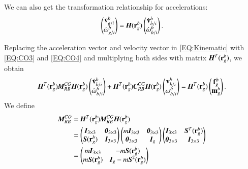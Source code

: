 We can also get the transformation relationship for accelerations:
\begin{align}
\begin{pmatrix}
\dot{\vec{v}}^{b}_{g/i} \\
\dot{\vec{\omega}}^{b}_{g/i}
\end{pmatrix}
=\emph{\textbf{H}}(\vec{r}^{b}_{g})
\begin{pmatrix}
\dot{\vec{v}}^{b}_{b/i} \\
\dot{\vec{\omega}}^{b}_{b/i}
\end{pmatrix}\label{EQ:CO4}.
\end{align}

Replacing the acceleration vector and velocity vector in \ref{EQ:Kinematic} with \ref{EQ:CO3} and \ref{EQ:CO4} and multiplying both sides with matrix $\emph{\textbf{H}}^{T}(\vec{r}^{b}_{g})$, we obtain 
\begin{align}
\emph{\textbf{H}}^{T}(\vec{r}^{b}_{g})\emph{\textbf{M}}_{RB}^{CG}\emph{\textbf{H}}(\vec{r}^{b}_{g})
\begin{pmatrix}
\dot{\vec{v}}^{b}_{b/i} \\
\dot{\vec{\omega}}^{b}_{b/i}
\end{pmatrix}
+
\emph{\textbf{H}}^{T}(\vec{r}^{b}_{g})\emph{\textbf{C}}_{RB}^{CG}\emph{\textbf{H}}(\vec{r}^{b}_{g})
\begin{pmatrix}
\vec{v}^{b}_{b/i} \\
\vec{\omega}^{b}_{b/i}
\end{pmatrix}
=
\emph{\textbf{H}}^{T}(\vec{r}_{g}^{b})
\begin{pmatrix}
\vec{f}^{b}_{g} \\
\vec{m}^{b}_{g}
\end{pmatrix}\label{EQ:CO5}.
\end{align}
We define
\begin{align}
\emph{\textbf{M}}^{CO}_{RB} &=
\emph{\textbf{H}}^{T}(\vec{r}^{b}_{g})\emph{\textbf{M}}_{RB}^{CG}\emph{\textbf{H}}(\vec{r}^{b}_{g}) \nonumber \\
&=
\begin{pmatrix}
\emph{\textbf{I}}_{3\times 3}&\emph{\textbf{0}}_{3\times 3} \\
\emph{\textbf{S}}(\vec{r}^{b}_{g})
&\emph{\textbf{I}}_{3\times 3}
\end{pmatrix}
\begin{pmatrix}
m\emph{\textbf{I}}_{3\times 3}&\emph{\textbf{0}}_{3\times 3}\\ \emph{\textbf{0}}_{3\times 3}&
\emph{\textbf{I}}_{g}
\end{pmatrix}
\begin{pmatrix}
\emph{\textbf{I}}_{3\times 3}& \emph{\textbf{S}}^{T}(\vec{r}^{b}_{g})\\
\emph{\textbf{0}}_{3\times 3}
&\emph{\textbf{I}}_{3\times 3}
\end{pmatrix} \nonumber \\
&=
\begin{pmatrix}
m\emph{\textbf{I}}_{3\times 3}&-m\emph{\textbf{S}}(\vec{r}_{g}^{b}) \\
m\emph{\textbf{S}}(\vec{r}_{g}^{b})&
\emph{\textbf{I}}_{g}-m\emph{\textbf{S}}^{2}(\vec{r}^{b}_{g})
\end{pmatrix}\label{EQ:MRBCO}
\end{align}
